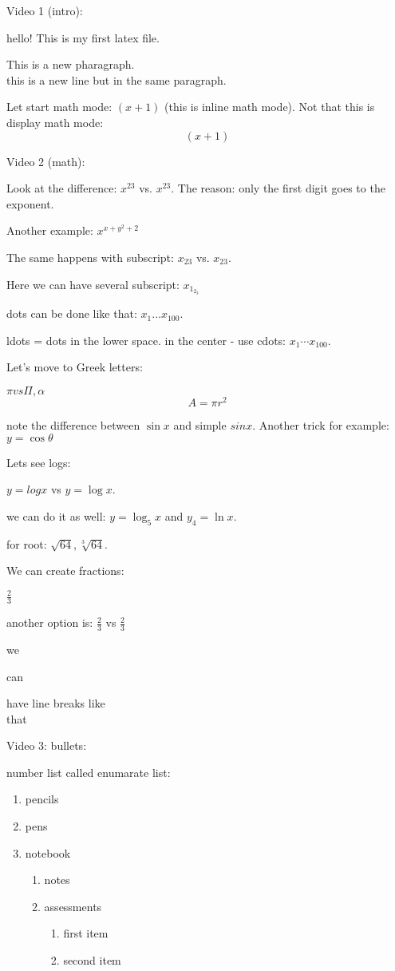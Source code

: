 \documentclass[11pt]{article}
\begin{document}
Video 1 (intro):

hello!
This is my first latex file.

This is a new pharagraph.\\this is a new line but in the same paragraph.

Let start math mode: $(x+1)$ (this is inline math mode).
Not that this is display math mode: $$(x+1)$$

Video 2 (math):

Look at the difference: $x^23$ vs. $x^{23}$. The reason: only the first digit goes to the exponent.

Another example: $x^{x+y^2+2}$

The same happens with subscript: $x_23$ vs. $x_{23}$.

Here we can have several subscript: $x_{1_{2_3}}$

dots can be done like that: $x_1 \ldots x_{100}$.

ldots = dots in the lower space. in the center - use cdots: $x_1 \cdots x_{100}$.

Let's move to Greek letters:

$\pi  vs  \Pi, \alpha$
$$ A = \pi r^2$$

note the difference between $\sin x$ and simple $sinx$.
Another trick for example: $y=\cos \theta$

Lets see logs:

$y =log x$ vs $y=\log x$.

we can do it as well: $y = \log_5 x$ and $y_4 = \ln x$.

for root: 
$\sqrt{64}, \sqrt[3]{64}$.

We can create fractions:

$\frac{2}{3}$

another option is: $\displaystyle \frac{2}{3}$ vs $\frac{2}{3}$

we

can

have line breaks like \\[16pt] that

Video 3: bullets:


number list called enumarate list:

\begin{enumerate}
\item pencils
\item pens
\item notebook
	\begin{enumerate}
	\item notes
	\item assessments
		\begin{enumerate}
		\item first item
		\item second item
		
		\end{enumerate}
	
	\end{enumerate}
\end{enumerate}
\end{document}

